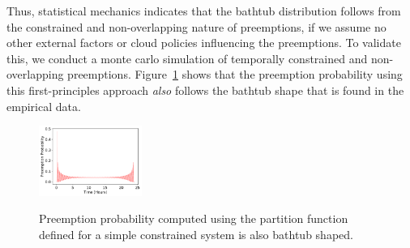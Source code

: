 Thus, statistical mechanics indicates that the bathtub distribution follows from the constrained and non-overlapping nature of preemptions, if we assume no other external factors or cloud policies influencing the preemptions. 
To validate this, we conduct a monte carlo simulation of temporally constrained and non-overlapping preemptions. 
Figure~\ref{fig:partfun} shows that the preemption probability using this first-principles approach \emph{also} follows the bathtub shape that is found in the empirical data. 






\begin{figure}[t]
  \centering
  \includegraphics[width=0.3\textwidth]{../graphs/analytical_prob.pdf}
  \label{fig:partfun}
  \caption{Preemption probability computed using the partition function defined for a simple constrained system is also bathtub shaped.}
\end{figure}

 


